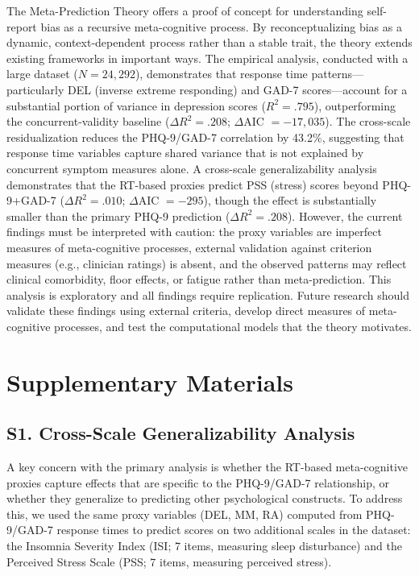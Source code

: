 \documentclass[10pt,twocolumn]{article}
\begin{document}
The Meta-Prediction Theory offers a proof of concept for understanding self-report bias as a recursive meta-cognitive process. By reconceptualizing bias as a dynamic, context-dependent process rather than a stable trait, the theory extends existing frameworks in important ways. The empirical analysis, conducted with a large dataset ($N = 24{,}292$), demonstrates that response time patterns---particularly DEL (inverse extreme responding) and GAD-7 scores---account for a substantial portion of variance in depression scores ($R^2 = .795$), outperforming the concurrent-validity baseline ($\Delta R^2 = .208$; $\Delta$AIC $= -17{,}035$). The cross-scale residualization reduces the PHQ-9/GAD-7 correlation by 43.2\%, suggesting that response time variables capture shared variance that is not explained by concurrent symptom measures alone. A cross-scale generalizability analysis demonstrates that the RT-based proxies predict PSS (stress) scores beyond PHQ-9+GAD-7 ($\Delta R^2 = .010$; $\Delta$AIC $= -295$), though the effect is substantially smaller than the primary PHQ-9 prediction ($\Delta R^2 = .208$). However, the current findings must be interpreted with caution: the proxy variables are imperfect measures of meta-cognitive processes, external validation against criterion measures (e.g., clinician ratings) is absent, and the observed patterns may reflect clinical comorbidity, floor effects, or fatigue rather than meta-prediction. This analysis is exploratory and all findings require replication. Future research should validate these findings using external criteria, develop direct measures of meta-cognitive processes, and test the computational models that the theory motivates.


\section*{Supplementary Materials}

\subsection*{S1. Cross-Scale Generalizability Analysis}

A key concern with the primary analysis is whether the RT-based meta-cognitive proxies capture effects that are specific to the PHQ-9/GAD-7 relationship, or whether they generalize to predicting other psychological constructs. To address this, we used the same proxy variables (DEL, MM, RA) computed from PHQ-9/GAD-7 response times to predict scores on two additional scales in the dataset: the Insomnia Severity Index (ISI; 7 items, measuring sleep disturbance) and the Perceived Stress Scale (PSS; 7 items, measuring perceived stress).
\end{document}
